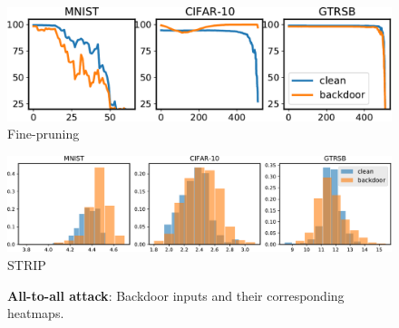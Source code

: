 \documentclass{article}
\begin{document}
\begin{figure}[t]
    \centering
    \includegraphics[width=1\textwidth]{figures_supplementary/fine_pruning_all2all_figure.pdf}
    \caption{Fine-pruning}
    \label{fig:fine_pruning_all2all}
\end{figure}

\begin{figure}[t]
    \centering
    \includegraphics[width=1\textwidth]{figures_supplementary/STRIP_all2all_figure.pdf}
    \caption{STRIP}
    \label{fig:STRIP_all2all}
\end{figure}

\begin{figure}[t]
\centering
{}
\hspace{2mm}
    \vspace{-1mm}
\caption{{\bfseries All-to-all attack}: Backdoor inputs and their corresponding heatmaps.}
    \vspace{-4mm}
\label{fig:gradcam_all2all}
\end{figure}
\end{document}
